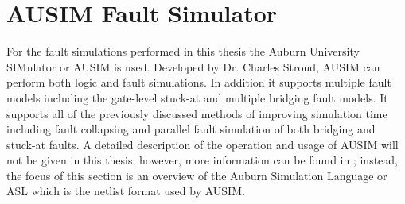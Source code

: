 \documentclass[12pt]{report}
\begin{document}
\section{AUSIM Fault Simulator}
\label{sct:ausim}
For the fault simulations performed in this thesis the Auburn University SIMulator or AUSIM is used.  Developed by Dr. Charles Stroud\cite{ausim}\cite{asl}, AUSIM can perform both logic and fault simulations.  In addition it supports multiple fault models including the gate-level stuck-at and multiple bridging fault models\cite{ausim}.  It supports all of the previously discussed methods of improving simulation time including fault collapsing and parallel fault simulation of both bridging and stuck-at faults\cite{ausim}.  A detailed description of the operation and usage of AUSIM will not be given in this thesis; however, more information can be found in \cite{ausim}\cite{asl}; instead, the focus of this section is an overview of the Auburn Simulation Language or ASL which is the netlist format used by AUSIM.
\end{document}
